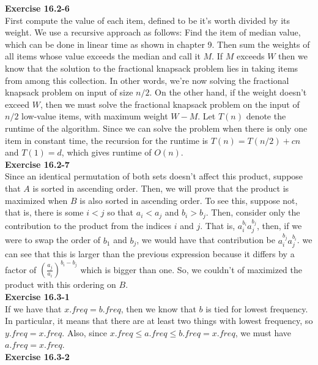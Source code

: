 \documentclass{article}
\begin{document}
\noindent\textbf{Exercise 16.2-6}\\

First compute the value of each item, defined to be it's worth divided by its weight.  We use a recursive approach as follows: Find the item of median value, which can be done in linear time as shown in chapter 9.  Then sum the weights of all items whose value exceeds the median and call it $M$.  If $M$ exceeds $W$ then we know that the solution to the fractional knapsack problem lies in taking items from among this collection.  In other words, we're now solving the fractional knapsack problem on input of size $n/2$.  On the other hand, if the weight doesn't exceed $W$, then we must solve the fractional knapsack problem on the input of $n/2$ low-value items, with maximum weight $W-M$.  Let $T(n)$ denote the runtime of the algorithm.  Since we can solve the problem when there is only one item in constant time, the recursion for the runtime is $T(n) = T(n/2) + cn$ and $T(1) = d$, which gives runtime of $O(n)$. \\

\noindent\textbf{Exercise 16.2-7}\\

Since an identical permutation of both sets doesn't affect this product, suppose that $A$ is sorted in ascending order. Then, we will prove that the product is maximized when $B$ is also sorted in ascending order. To see this, suppose not, that is, there is some $i < j$ so that $a_i<a_j$ and $b_i > b_j$. Then, consider only the contribution to the product from the indices $i$ and $j$. That is, $a_i^{b_i}a_j^{b_j}$, then, if we were to swap the order of $b_1$ and $b_j$, we would have that contribution be $a_i^{b_j}a_j^{b_i}$. we can see that this is larger than the previous expression because it differs by a factor of $(\frac{a_j}{a_i})^{b_i-b_j}$ which is bigger than one. So, we couldn't of maximized the product with this ordering on $B$.\\

\noindent\textbf{Exercise 16.3-1}\\

If we have that $x.freq = b.freq$, then we know that $b$ is tied for lowest frequency. In particular, it means that there are at least two things with lowest frequency, so $y.freq = x.freq$. Also, since $x.freq \le a.freq \le b.freq = x.freq$, we must have $a.freq = x.freq$.\\

\noindent\textbf{Exercise 16.3-2}\\
\end{document}
